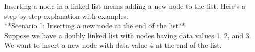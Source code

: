 \documentclass[preview]{standalone}
\begin{document}
Inserting a node in a linked list means adding a new node to the list. Here's a step-by-step explanation with examples:\\**Scenario 1: Inserting a new node at the end of the list**\\Suppose we have a doubly linked list with nodes having data values 1, 2, and 3. We want to insert a new node with data value 4 at the end of the list.\\
\end{document}
